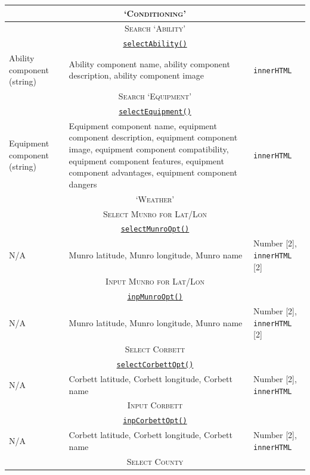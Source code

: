 \documentclass[11pt, english]{article}
\begin{document}
\begin{center}
\begin{longtable}{p{4cm}p{6cm}p{2cm}}
		\hline
		\hline
		\multicolumn{3}{c}{\textsc{`Conditioning'}}\\
		\hline
		\hline
		\multicolumn{3}{c}{\textsc{Search `Ability'}}\\
		\hline
		\multicolumn{3}{c}{\underline{\texttt{selectAbility()}}}\\
		Ability component (string) & Ability component name, ability component description, ability component image & \texttt{innerHTML}\\
		\hline
		\multicolumn{3}{c}{\textsc{Search `Equipment'}}\\
		\hline
		\multicolumn{3}{c}{\underline{\texttt{selectEquipment()}}}\\
		Equipment component (string) & Equipment component name, equipment component description, equipment component image, equipment component compatibility, equipment component features, equipment component advantages, equipment component dangers & \texttt{innerHTML}\\
		\hline
		\hline
		\multicolumn{3}{c}{\textsc{`Weather'}}\\
		\hline
		\hline
		\multicolumn{3}{c}{\textsc{Select Munro for Lat/Lon}}\\
		\hline
		\multicolumn{3}{c}{\underline{\texttt{selectMunroOpt()}}}\\
		N/A & Munro latitude, Munro longitude, Munro name & Number [2], \texttt{innerHTML} [2]\\
		\hline
		\multicolumn{3}{c}{\textsc{Input Munro for Lat/Lon}}\\
		\hline
		\multicolumn{3}{c}{\underline{\texttt{inpMunroOpt()}}}\\
		N/A & Munro latitude, Munro longitude, Munro name & Number [2], \texttt{innerHTML} [2]\\
		\hline
		\multicolumn{3}{c}{\textsc{Select Corbett}}\\
		\hline
		\multicolumn{3}{c}{\underline{\texttt{selectCorbettOpt()}}}\\
		N/A & Corbett latitude, Corbett longitude, Corbett name & Number [2], \texttt{innerHTML}\\
		\hline
		\multicolumn{3}{c}{\textsc{Input Corbett}}\\
		\hline
		\multicolumn{3}{c}{\underline{\texttt{inpCorbettOpt()}}}\\
		N/A & Corbett latitude, Corbett longitude, Corbett name & Number [2], \texttt{innerHTML}\\
		\hline
		\multicolumn{3}{c}{\textsc{Select County}}\\
		\hline

\end{longtable}
\end{center}
\end{document}
